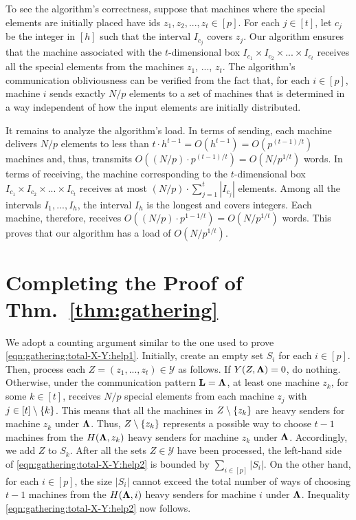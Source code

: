 \documentclass[sigconf]{acmart}
\def\vgap{\vspace{0mm}}
\def\YY{\mathscr{Y}}
\begin{document}
\vgap

To see the algorithm's correctness, suppose that machines where the special elements are initially placed have ids $z_1, z_2, ..., z_t \in [p]$. For each $j \in [t]$, let $c_j$ be the integer in $[h]$ such that the interval $I_{c_j}$ covers $z_j$. Our algorithm ensures that the machine associated with the $t$-dimensional box $I_{c_1} \times I_{c_2} \times ... \times I_{c_t}$ receives all the special elements from the machines $z_1$, ..., $z_t$. The algorithm's communication obliviousness can be verified from the fact that, for each $i \in [p]$, machine $i$ sends exactly $N/p$ elements to a set of machines that is determined in a way independent of how the input elements are initially distributed.

\vgap

It remains to analyze the algorithm's load. In terms of sending, each machine delivers $N/p$ elements to less than $t \cdot h^{t-1} = O(h^{t-1}) = O(p^{(t-1)/t})$ machines and, thus, transmits $O((N/p) \cdot p^{(t-1)/t}) = O(N/p^{1/t})$ words. In terms of receiving, the machine corresponding to the $t$-dimensional box $I_{c_1} \times I_{c_2} \times ... \times I_{c_t}$ receives at most $(N/p) \cdot \sum_{j=1}^t |I_{c_j}|$ elements. Among all the intervals $I_1, ..., I_h$, the interval $I_h$ is the longest and covers
integers. Each machine, therefore, receives $O((N/p) \cdot p^{1-1/t}) = O(N / p^{1/t})$ words. This proves that our algorithm has a load of $O(N / p^{1/t})$.

\section{Completing the Proof of Thm.~\ref{thm:gathering}} \label{app:proof:thm:gathering}

 We adopt a counting argument similar to the one used to prove \eqref{eqn:gathering:total-X-Y:help1}. Initially, create an empty set $S_i$ for each $i \in [p]$. Then, process each $Z = (z_1, ..., z_t) \in \YY$ as follows. If $Y(Z, \mathbf{\Lambda}) = 0$, do nothing. Otherwise, under the communication pattern $\mathbf{L} = \mathbf{\Lambda}$, at least one machine $z_k$, for some $k \in [t]$, receives $N/p$ special elements from each machine $z_j$ with $j \in [t] \setminus \{k\}$. This means that all the machines in $Z \setminus \{z_k\}$ are heavy senders for machine $z_k$ under $\mathbf{\Lambda}$. Thus, $Z \setminus \{z_k\}$ represents a possible way to choose $t-1$ machines from the $H(\mathbf{\Lambda}, z_k)$ heavy senders for machine $z_k$ under $\mathbf{\Lambda}$. Accordingly, we add $Z$ to $S_k$. After all the sets $Z \in \YY$ have been processed, the left-hand side of \eqref{eqn:gathering:total-X-Y:help2} is bounded by $\sum_{i \in [p]} |S_i|$. On the other hand, for each $i \in [p]$, the size $|S_i|$ cannot exceed the total number of ways of choosing $t - 1$ machines from the $H(\mathbf{\Lambda}, i)$ heavy senders for machine $i$ under $\mathbf{\Lambda}$. Inequality \eqref{eqn:gathering:total-X-Y:help2} now follows.
\end{document}
